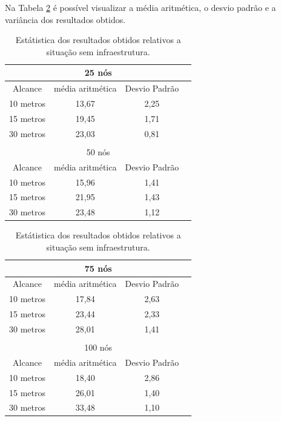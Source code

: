 	Na Tabela \ref{tab:estatiscaResultadosObtidosSemInfraestrutura} é possível visualizar a média aritmética, o desvio padrão e a variância dos resultados obtidos. 

	\begin{table}[!htb]
	    \caption{Estátistica dos resultados obtidos relativos a situação sem infraestrutura.}
	    \label{tab:estatiscaResultadosObtidosSemInfraestrutura}
	    \centering
	    \tiny
	    \begin{minipage}{.5\linewidth}
	      
	      \centering
	        \begin{tabular}{|c|c|c|c|}

			\hline
			\multicolumn{4}{|c|}{25 nós} \\ \hline
			Alcance   & média aritmética &	Desvio Padrão  \\ \hline
			10 metros &	13,67 & 2,25  \\ \hline
			15 metros &	19,45 & 1,71   \\ \hline
			30 metros &	23,03 & 0,81  \\ \hline

			\multicolumn{4}{|c|}{} \\ \hline

			\multicolumn{4}{|c|}{50 nós} \\ \hline
			Alcance   & média aritmética &	Desvio Padrão \\ \hline
			10 metros &	15,96	& 1,41   \\ \hline
			15 metros &	21,95	& 1,43   \\ \hline
			30 metros &	23,48	& 1,12  \\ \hline

		\end{tabular}
	    \end{minipage}%
	    \begin{minipage}{.5\linewidth}
	      \centering
	        \begin{tabular}{|c|c|c|c|}
	        \hline
			\multicolumn{4}{|c|}{75 nós} \\ \hline
			Alcance   & média aritmética &	Desvio Padrão   \\ \hline
			10 metros &	17,84 & 2,63   \\ \hline
			15 metros &	23,44 & 2,33   \\ \hline
			30 metros &	28,01 & 1,41  \\ \hline

			\multicolumn{4}{|c|}{} \\ \hline


			\multicolumn{4}{|c|}{100 nós} \\ \hline
			Alcance   & média aritmética &	Desvio Padrão   \\ \hline
			10 metros &	18,40	& 2,86   \\ \hline
			15 metros &	26,01	& 1,40   \\ \hline
			30 metros &	33,48	& 1,10  \\ \hline

		\end{tabular}

	    \end{minipage} 
	\end{table}

